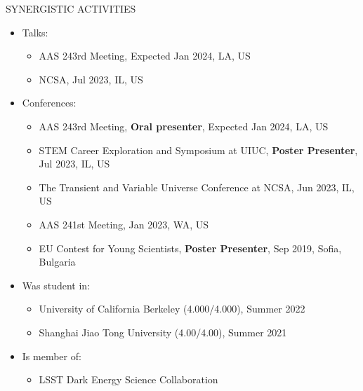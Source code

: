\documentclass[10pt]{article} %
\begin{document}
\newpage

\begin{section}{SYNERGISTIC ACTIVITIES}
    
\begin{itemize}[leftmargin=1.5em]
    \item Talks: 
    \begin{itemize}[leftmargin=1.5em]
        \item AAS 243rd Meeting, Expected Jan 2024, LA, US
        \item NCSA, Jul 2023, IL, US
    \end{itemize}
    \item Conferences: 
    \begin{itemize}[leftmargin=1.5em]
        \item AAS 243rd Meeting, \textbf{Oral presenter}, Expected Jan 2024, LA, US
        \item STEM Career Exploration and Symposium at UIUC, \textbf{Poster Presenter}, Jul 2023, IL, US
        \item The Transient and Variable Universe Conference at NCSA, Jun 2023, IL, US
        \item AAS 241st Meeting, Jan 2023, WA, US
        \item EU Contest for Young Scientists, \textbf{Poster Presenter}, Sep 2019, Sofia, Bulgaria
    \end{itemize}
    \item Was student in: 
    \begin{itemize}[leftmargin=1.5em]
        \item University of California Berkeley (4.000/4.000), Summer 2022
        \item Shanghai Jiao Tong University (4.00/4.00), Summer 2021
    \end{itemize}
    \item Is member of: 
    \begin{itemize}[leftmargin=1.5em]
        \item LSST Dark Energy Science Collaboration
    \end{itemize}
\end{itemize}

\end{section}
\end{document}
